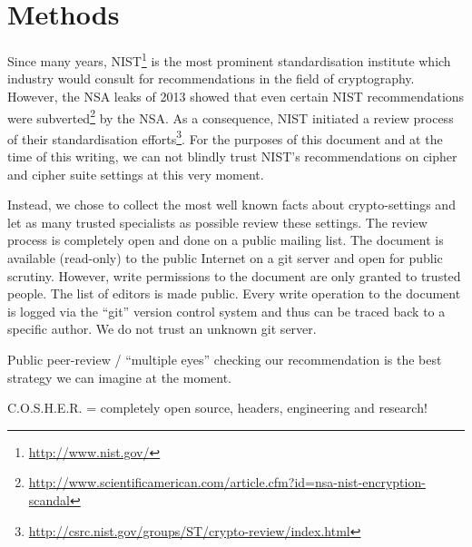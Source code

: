 \section{Methods}

Since many years, NIST\footnote{\url{http://www.nist.gov/}} is the most
prominent standardisation institute which industry would consult for
recommendations in the field of cryptography. However, the NSA leaks of 2013
showed that even certain NIST recommendations were
subverted\footnote{\url{http://www.scientificamerican.com/article.cfm?id=nsa-nist-encryption-scandal}}
by the NSA.  As a consequence, NIST initiated a review process of their
standardisation
efforts\footnote{\url{http://csrc.nist.gov/groups/ST/crypto-review/index.html}}.
For the purposes of this document and at the time of this writing, we
can not blindly trust NIST's recommendations on cipher and cipher suite
settings at this very moment. 

Instead, we chose to collect the most well known facts about crypto-settings
and let as many trusted specialists as possible review these settings.  The
review process is completely open and done on a public mailing list. The
document is available (read-only) to the public Internet on a git server and
open for public scrutiny. However, write permissions to the document are only
granted to trusted people. The list of editors is made public.  Every write
operation to the document is logged via the ``git'' version control system and
thus can be traced back to a specific author.  We do not trust an unknown git
server. 

Public peer-review / ``multiple eyes'' checking our recommendation is the best
strategy we can imagine at the moment.

C.O.S.H.E.R. = completely open source, headers, engineering and research!
